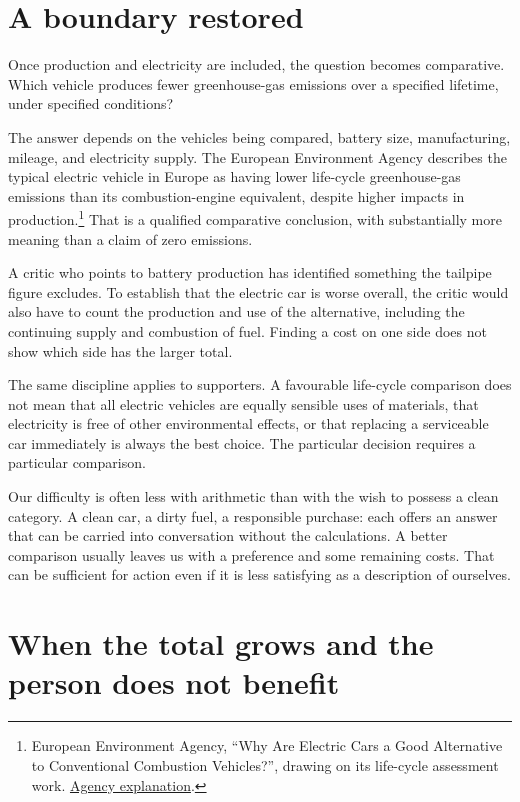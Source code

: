 \documentclass[12pt,a4paper]{book}
\begin{document}
\section*{A boundary restored}

Once production and electricity are included, the question becomes comparative. Which vehicle produces fewer greenhouse-gas emissions over a specified lifetime, under specified conditions?

The answer depends on the vehicles being compared, battery size, manufacturing, mileage, and electricity supply. The European Environment Agency describes the typical electric vehicle in Europe as having lower life-cycle greenhouse-gas emissions than its combustion-engine equivalent, despite higher impacts in production.\footnote{European Environment Agency, ``Why Are Electric Cars a Good Alternative to Conventional Combustion Vehicles?'', drawing on its life-cycle assessment work. \href{https://www.eea.europa.eu/en/about/contact-us/faqs/why-are-electric-cars-a-good-alternative-to-conventional-combustion-vehicles}{Agency explanation}.} That is a qualified comparative conclusion, with substantially more meaning than a claim of zero emissions.

A critic who points to battery production has identified something the tailpipe figure excludes. To establish that the electric car is worse overall, the critic would also have to count the production and use of the alternative, including the continuing supply and combustion of fuel. Finding a cost on one side does not show which side has the larger total.

The same discipline applies to supporters. A favourable life-cycle comparison does not mean that all electric vehicles are equally sensible uses of materials, that electricity is free of other environmental effects, or that replacing a serviceable car immediately is always the best choice. The particular decision requires a particular comparison.

Our difficulty is often less with arithmetic than with the wish to possess a clean category. A clean car, a dirty fuel, a responsible purchase: each offers an answer that can be carried into conversation without the calculations. A better comparison usually leaves us with a preference and some remaining costs. That can be sufficient for action even if it is less satisfying as a description of ourselves.

\section*{When the total grows and the person does not benefit}
\end{document}
